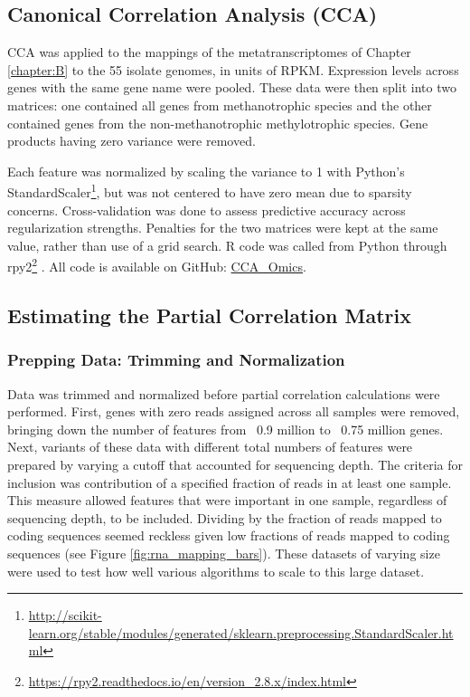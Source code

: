 \subsection{Canonical Correlation Analysis (CCA)}
CCA was applied to the mappings of the metatranscriptomes of Chapter \ref{chapter:B} to the 55 isolate genomes, in units of RPKM.
Expression levels across genes with the same gene name were pooled.
These data were then split into two matrices: one contained all genes from methanotrophic species and the other contained genes from the non-methanotrophic methylotrophic species.
Gene products having zero variance were removed.

Each feature was normalized by scaling the variance to 1 with Python's StandardScaler\footnote{\url{http://scikit-learn.org/stable/modules/generated/sklearn.preprocessing.StandardScaler.html}}, but was not centered to have zero mean due to sparsity concerns.
Cross-validation was done to assess predictive accuracy across regularization strengths.
Penalties for the two matrices were kept at the same value, rather than use of a grid search.  %
R code was called from Python through rpy2\footnote{\url{https://rpy2.readthedocs.io/en/version_2.8.x/index.html}} \cite{gautier2008}.
All code is available on GitHub: \href{https://github.com/JanetMatsen/CCA_Omics}{CCA\_Omics}.

\subsection{Estimating the Partial Correlation Matrix}

\subsubsection{Prepping Data: Trimming and Normalization}
Data was trimmed and normalized before partial correlation calculations were performed.
First, genes with zero reads assigned across all samples were removed, bringing down the number of features from ~0.9 million to ~0.75 million genes. %
Next, variants of these data with different total numbers of features were prepared by varying a cutoff that accounted for sequencing depth.
The criteria for inclusion was contribution of a specified fraction of reads in at least one sample.
This measure allowed features that were important in one sample, regardless of sequencing depth, to be included.
Dividing by the fraction of reads mapped to coding sequences seemed reckless given low fractions of reads mapped to coding sequences (see Figure \ref{fig:rna_mapping_bars}).
These datasets of varying size were used to test how well various algorithms to scale to this large dataset.

